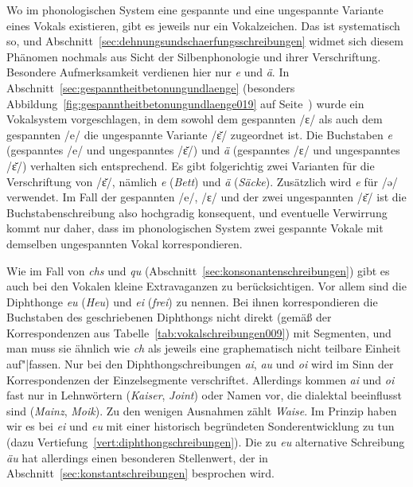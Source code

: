 Wo im phonologischen System eine gespannte und eine ungespannte Variante eines Vokals existieren, gibt es jeweils nur ein Vokalzeichen.
Das ist systematisch so, und Abschnitt~\ref{sec:dehnungsundschaerfungsschreibungen} widmet sich diesem Phänomen nochmals aus Sicht der Silbenphonologie und ihrer Verschriftung.
Besondere Aufmerksamkeit verdienen hier nur \textit{e} und \textit{ä}.
In Abschnitt~\ref{sec:gespanntheitbetonungundlaenge} (besonders Abbildung~\ref{fig:gespanntheitbetonungundlaenge019} auf Seite~\pageref{fig:gespanntheitbetonungundlaenge019}) wurde ein Vokalsystem vorgeschlagen, in dem sowohl dem gespannten /ɛ/ als auch dem gespannten /e/ die ungespannte Variante /ɛ̆/ zugeordnet ist.
Die Buchstaben \textit{e} (gespanntes /e/ und ungespanntes /ɛ̆/) und \textit{ä} (gespanntes /ɛ/ und ungespanntes /ɛ̆/) verhalten sich entsprechend.
Es gibt folgerichtig zwei Varianten für die Verschriftung von /ɛ̆/, nämlich \textit{e} (\textit{Bett}) und \textit{ä} (\textit{Säcke}).
Zusätzlich wird \textit{e} für /ə/ verwendet.
Im Fall der gespannten /e/, /ɛ/ und der zwei ungespannten /ɛ̆/ ist die Buchstabenschreibung also hochgradig konsequent, und eventuelle Verwirrung kommt nur daher, dass im phonologischen System zwei gespannte Vokale mit demselben ungespannten Vokal korrespondieren.

Wie im Fall von \textit{chs} und \textit{qu} (Abschnitt~\ref{sec:konsonantenschreibungen}) gibt es auch bei den Vokalen kleine Extravaganzen zu berücksichtigen.
Vor allem sind die Diphthonge \textit{eu} (\textit{Heu}) und \textit{ei} (\textit{frei}) zu nennen.
Bei ihnen korrespondieren die Buchstaben des geschriebenen Diphthongs nicht direkt (gemäß der Korrespondenzen aus Tabelle~\ref{tab:vokalschreibungen009}) mit Segmenten, und man muss sie ähnlich wie \textit{ch} als jeweils eine graphematisch nicht teilbare Einheit auf"|fassen.
Nur bei den Diphthongschreibungen \textit{ai}, \textit{au} und \textit{oi} wird im Sinn der Korrespondenzen der Einzelsegmente verschriftet.
Allerdings kommen \textit{ai} und \textit{oi} fast nur in Lehnwörtern (\textit{Kaiser}, \textit{Joint}) oder Namen vor, die dialektal beeinflusst sind (\textit{Mainz}, \textit{Moik}).
Zu den wenigen Ausnahmen zählt \textit{Waise}.
Im Prinzip haben wir es bei \textit{ei} und \textit{eu} mit einer historisch begründeten Sonderentwicklung zu tun (dazu Vertiefung~\ref{vert:diphthongschreibungen}).
Die zu \textit{eu} alternative Schreibung \textit{äu} hat allerdings einen besonderen Stellenwert, der in Abschnitt~\ref{sec:konstantschreibungen} besprochen wird.


